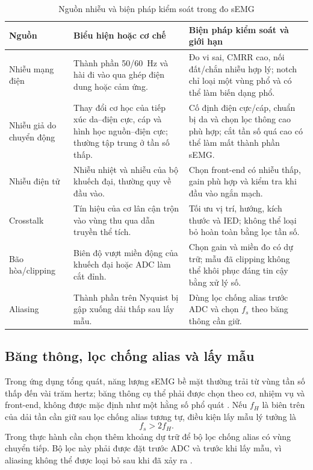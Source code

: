 \begin{table}[htbp]
\centering
\caption{Nguồn nhiễu và biện pháp kiểm soát trong đo sEMG}
\label{tab:noise-mitigation}
\begin{tabularx}{\textwidth}{@{}P{3.0cm}Y Y@{}}
\toprule
\textbf{Nguồn} & \textbf{Biểu hiện hoặc cơ chế} & \textbf{Biện pháp kiểm soát và giới hạn} \\
\midrule
Nhiễu mạng điện & Thành phần 50/60~Hz và hài đi vào qua ghép điện dung hoặc cảm ứng. & Đo vi sai, CMRR cao, nối đất/chắn nhiễu hợp lý; notch chỉ loại một vùng phổ và có thể làm biến dạng phổ. \\
Nhiễu giả do chuyển động & Thay đổi cơ học của tiếp xúc da--điện cực, cáp và hình học nguồn--điện cực; thường tập trung ở tần số thấp. & Cố định điện cực/cáp, chuẩn bị da và chọn lọc thông cao phù hợp; cắt tần số quá cao có thể làm mất thành phần sEMG. \\
Nhiễu điện tử & Nhiễu nhiệt và nhiễu của bộ khuếch đại, thường quy về đầu vào. & Chọn front-end có nhiễu thấp, gain phù hợp và kiểm tra khi đầu vào ngắn mạch. \\
Crosstalk & Tín hiệu của cơ lân cận trộn vào vùng thu qua dẫn truyền thể tích. & Tối ưu vị trí, hướng, kích thước và IED; không thể loại bỏ hoàn toàn bằng lọc tần số. \\
Bão hòa/clipping & Biên độ vượt miền động của khuếch đại hoặc ADC làm cắt đỉnh. & Chọn gain và miền đo có dự trữ; mẫu đã clipping không thể khôi phục đáng tin cậy bằng xử lý số. \\
Aliasing & Thành phần trên Nyquist bị gập xuống dải thấp sau lấy mẫu. & Dùng lọc chống alias trước ADC và chọn $f_s$ theo băng thông cần giữ. \\
\bottomrule
\end{tabularx}
\end{table}

\subsection{Băng thông, lọc chống alias và lấy mẫu}
\label{sec:sampling}

Trong ứng dụng tổng quát, năng lượng sEMG bề mặt thường trải từ vùng tần
số thấp đến vài trăm hertz; băng thông cụ thể phải được chọn theo cơ,
nhiệm vụ và front-end, không được mặc định như một hằng số phổ quát
\cite{hermens2000development,merletti1999standards,mcmanus2020analysis}.
Nếu $f_H$ là biên trên của dải tần cần giữ sau lọc chống alias tương tự,
điều kiện lấy mẫu lý tưởng là
\begin{equation}
\label{eq:nyquist}
f_s > 2f_H.
\end{equation}
Trong thực hành cần chọn thêm khoảng dự trữ để bộ lọc chống alias có vùng
chuyển tiếp. Bộ lọc này phải được đặt trước ADC và trước khi lấy mẫu, vì
aliasing không thể được loại bỏ sau khi đã xảy ra
\cite{merletti1999standards,boyer2023reducing}.

